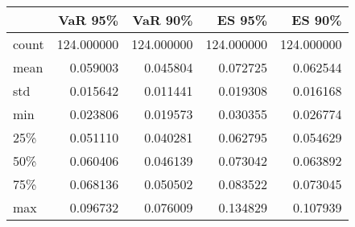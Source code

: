 \begin{tabular}{lrrrr}
\toprule
{} &     VaR 95\% &     VaR 90\% &      ES 95\% &      ES 90\% \\
\midrule
count &  124.000000 &  124.000000 &  124.000000 &  124.000000 \\
mean  &    0.059003 &    0.045804 &    0.072725 &    0.062544 \\
std   &    0.015642 &    0.011441 &    0.019308 &    0.016168 \\
min   &    0.023806 &    0.019573 &    0.030355 &    0.026774 \\
25\%   &    0.051110 &    0.040281 &    0.062795 &    0.054629 \\
50\%   &    0.060406 &    0.046139 &    0.073042 &    0.063892 \\
75\%   &    0.068136 &    0.050502 &    0.083522 &    0.073045 \\
max   &    0.096732 &    0.076009 &    0.134829 &    0.107939 \\
\bottomrule
\end{tabular}
